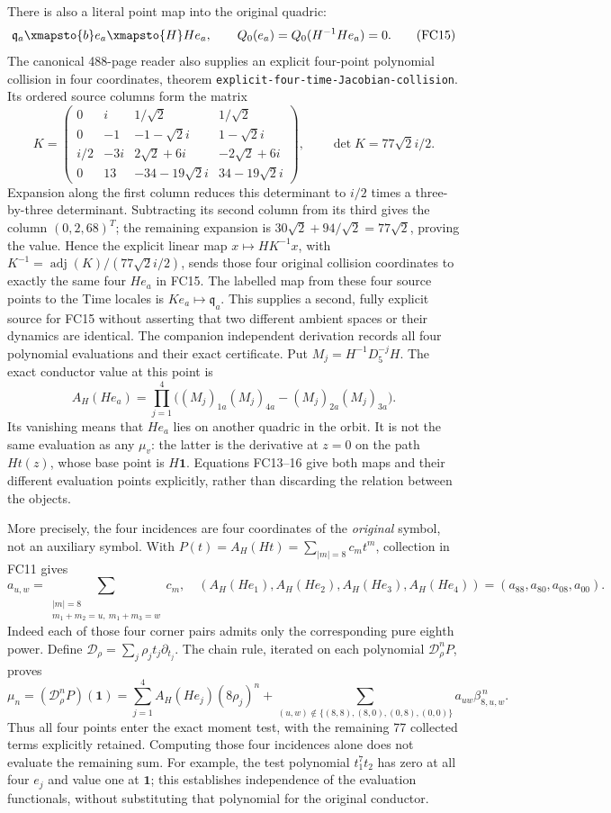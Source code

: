 \documentclass[11pt]{article}
\begin{document}
There is also a literal point map into the original quadric:
\[
 \mathfrak q_a\xmapsto{b}e_a\xmapsto{H}He_a,
 \qquad Q_0(e_a)=Q_0(H^{-1}He_a)=0.
\tag{FC15}
\]
The canonical 488-page reader \cite{ES488} also supplies an explicit
four-point polynomial collision in four coordinates, theorem
\texttt{explicit-four-time-Jacobian-collision}.
Its ordered source columns form the matrix
\[
 K=\begin{pmatrix}
 0&i&1/\sqrt2&1/\sqrt2\\
 0&-1&-1-\sqrt2 i&1-\sqrt2 i\\
 i/2&-3i&2\sqrt2+6i&-2\sqrt2+6i\\
 0&13&-34-19\sqrt2 i&34-19\sqrt2 i
 \end{pmatrix},\qquad \det K=77\sqrt2 i/2.
 \tag{FC15a}
\]
Expansion along the first column reduces this determinant to $i/2$
times a three-by-three determinant. Subtracting its second column from
its third gives the column $(0,2,68)^T$; the remaining expansion is
$30\sqrt2+94/\sqrt2=77\sqrt2$, proving the value. Hence the explicit
linear map $x\mapsto HK^{-1}x$, with
$K^{-1}=\operatorname{adj}(K)/(77\sqrt2 i/2)$, sends those four
original collision coordinates to exactly the same four $He_a$ in
FC15. The labelled map from these four source points to the Time locales
is $Ke_a\mapsto\mathfrak q_a$. This supplies a second, fully explicit
source for FC15 without asserting that two different ambient spaces or
their dynamics are identical. The companion independent derivation
records all four polynomial evaluations and their exact certificate.
Put $M_j=H^{-1}D_5^{-j}H$. The exact conductor value at this point is
\[
 A_H(He_a)=\prod_{j=1}^4
 \bigl((M_j)_{1a}(M_j)_{4a}-(M_j)_{2a}(M_j)_{3a}\bigr).
 \tag{FC16}
\]
Its vanishing means that $He_a$ lies on another quadric in the orbit.
It is not the same evaluation as any $\mu_v$: the latter is the
derivative at $z=0$ on the path $Ht(z)$, whose base point is $H\mathbf1$.
Equations FC13--16 give both maps and their different evaluation points
explicitly, rather than discarding the relation between the objects.

More precisely, the four incidences are four coordinates of the
\emph{original} symbol, not an auxiliary symbol. With
$P(t)=A_H(Ht)=\sum_{|m|=8}c_mt^m$, collection in FC11 gives
\[
 a_{u,w}=\sum_{\substack{|m|=8\\m_1+m_2=u,\ m_1+m_3=w}}c_m,
 \quad
 (A_H(He_1),A_H(He_2),A_H(He_3),A_H(He_4))
 =(a_{88},a_{80},a_{08},a_{00}).
 \tag{FC16a}
\]
Indeed each of those four corner pairs admits only the corresponding
pure eighth power. Define
$\mathcal D_\rho=\sum_j\rho_jt_j\partial_{t_j}$. The chain rule,
iterated on each polynomial $\mathcal D_\rho^nP$, proves
\[
 \mu_n=(\mathcal D_\rho^nP)(\mathbf1)
 =\sum_{j=1}^4A_H(He_j)(8\rho_j)^n
  +\sum_{(u,w)\notin\{(8,8),(8,0),(0,8),(0,0)\}}
      a_{uw}\beta_{8,u,w}^{\,n}.
 \tag{FC16b}
\]
Thus all four points enter the exact moment test, with the remaining
77 collected terms explicitly retained. Computing those four incidences
alone does not evaluate the remaining sum. For example, the test
polynomial $t_1^7t_2$ has zero at all four $e_j$ and value one at
$\mathbf1$; this establishes independence of the evaluation functionals,
without substituting that polynomial for the original conductor.
\end{document}

